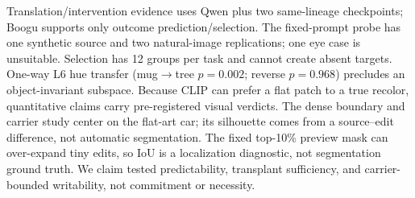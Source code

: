 Translation/intervention evidence uses Qwen plus two same-lineage checkpoints;
Boogu supports only outcome prediction/selection. The fixed-prompt probe has
one synthetic source and two natural-image replications; one eye case is
unsuitable. Selection has 12 groups per task and cannot create absent targets.
One-way L6 hue transfer (mug$\to$tree $p{=}0.002$; reverse $p{=}0.968$)
precludes an object-invariant subspace. Because CLIP can prefer a flat patch to
a true recolor, quantitative claims carry pre-registered visual verdicts. The
dense boundary and carrier study center on the flat-art car; its silhouette
comes from a source--edit difference, not automatic segmentation. The fixed
top-10\% preview mask can over-expand tiny edits, so IoU is a localization
diagnostic, not segmentation ground truth. We claim tested predictability,
transplant sufficiency, and carrier-bounded writability, not commitment or
necessity.
